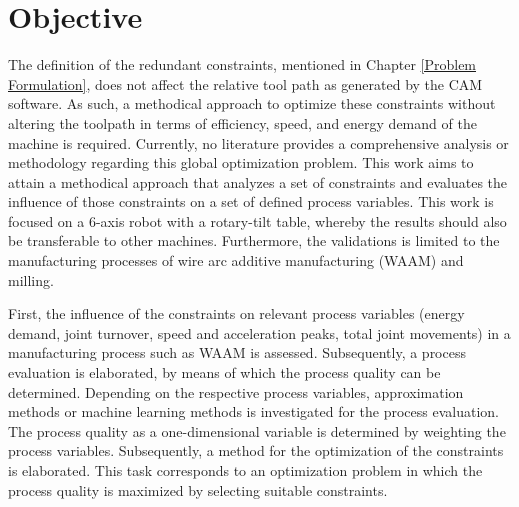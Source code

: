 \section{Objective}\label{OBJECTIVE}
The definition of the redundant constraints, mentioned in Chapter \ref{Problem Formulation}, does not affect the relative tool path as generated by the \acrshort{CAM} software. As such, a methodical approach to optimize these constraints without altering the toolpath in terms of efficiency, speed, and energy demand of the machine is required. Currently, no literature provides a comprehensive analysis or methodology regarding this global optimization problem.
This work aims to attain a methodical approach that analyzes a set of constraints and evaluates the influence of those constraints on a set of defined process variables. This work is focused on a 6-axis robot with a rotary-tilt table, whereby the results should also be transferable to other machines. Furthermore, the validations is limited to the manufacturing processes of wire arc additive manufacturing (\acrshort{WAAM}) and milling. 


First, the influence of the constraints on relevant process variables (energy demand, joint turnover, speed and acceleration peaks, total joint movements) in a manufacturing process such as \acrshort{WAAM} is assessed. Subsequently, a process evaluation is elaborated, by means of which the process quality can be determined. Depending on the respective process variables, approximation methods or machine learning methods is investigated for the process evaluation. The process quality as a one-dimensional variable is determined by weighting the process variables. Subsequently, a method for the optimization of the constraints is elaborated. This task corresponds to an optimization problem in which the process quality is maximized by selecting suitable constraints. 
